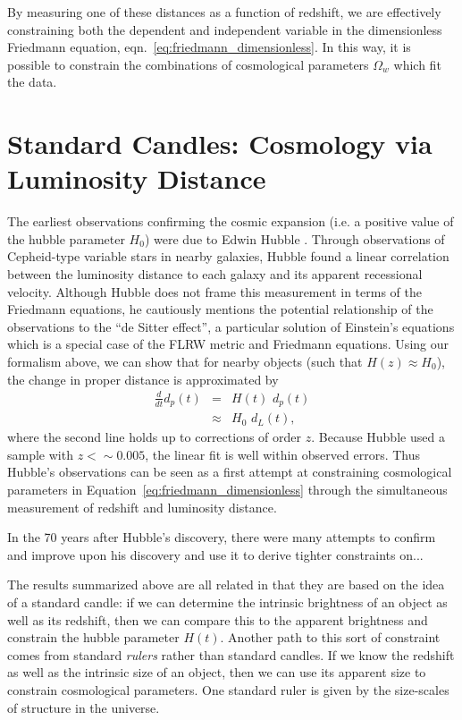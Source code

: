 By measuring one of these distances as a function of redshift, we are
effectively constraining both the dependent and independent variable
in the dimensionless Friedmann equation, eqn.~\ref{eq:friedmann_dimensionless}.
In this way, it is possible to constrain the combinations of cosmological
parameters $\Omega_w$ which fit the data.

\section{Standard Candles: Cosmology via Luminosity Distance}
\label{sec:std_candles}
The earliest observations confirming the cosmic expansion (i.e. a positive
value of the hubble parameter $H_0$) were due to Edwin Hubble
\citep{hubble1929}.  Through observations of Cepheid-type variable stars
in nearby galaxies, Hubble found a linear correlation between the
luminosity distance to each galaxy and its apparent recessional velocity.
Although Hubble does not frame this measurement in terms of the Friedmann
equations, he cautiously mentions the potential relationship of the
observations to the ``de Sitter effect'', a particular solution of
Einstein's equations which is a special case of the FLRW metric and
Friedmann equations. Using our formalism above, we can show that for
nearby objects (such that $H(z) \approx H_0$),
the change in proper distance is approximated by
\begin{eqnarray}
  \frac{d}{dt}d_p(t) &=& H(t)\,\, d_p(t) \nonumber\\
                     &\approx& H_0\,\, d_L(t),
\end{eqnarray}
where the second line holds up to corrections of order $z$.  Because
Hubble used a sample with $z <\sim 0.005$, the linear fit is well within
observed errors.
Thus Hubble's observations can be seen as a first attempt at constraining
cosmological parameters in Equation~\ref{eq:friedmann_dimensionless} through
the simultaneous measurement of redshift and luminosity distance.

In the 70 years after Hubble's discovery, there were many attempts to
confirm and improve upon his discovery and use it to derive tighter
constraints on...


The results summarized above are all related in that they are based on the
idea of a standard candle: if we can determine the intrinsic brightness
of an object as well as its redshift, then we can compare this to the
apparent brightness and constrain the hubble parameter $H(t)$.
Another path to this sort of constraint comes from standard {\it rulers}
rather than standard candles.  If we know the redshift as well as the
intrinsic size of an object, then we can use its apparent size to
constrain cosmological parameters.  One standard ruler is given by the
size-scales of structure in the universe.

